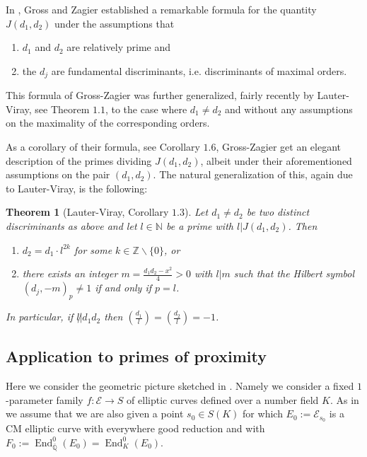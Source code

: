 \documentclass[12pt,twoside,a4paper]{article}
\theoremstyle{plain}%
\newtheorem{theorem}{Theorem}[section] %
\DeclareMathOperator{\End}{End}
\newcommand{\Z}{\mathbb{Z}}
\newcommand{\N}{\mathbb{N}}
\newcommand{\Q}{\mathbb{Q}}
\newcommand{\CE}{\mathcal{E}}
\begin{document}
In \cite{grosszagier}, Gross and Zagier established a remarkable formula for the quantity $J(d_1,d_2)$ under the assumptions that \begin{enumerate}
	\item $d_1$ and $d_2$ are relatively prime and
	\item the $d_j$ are fundamental discriminants, i.e. discriminants of maximal orders.
\end{enumerate}   This formula of Gross-Zagier was further generalized, fairly recently by Lauter-Viray, see \cite{lauterviray} Theorem $1.1$, to the case where $d_1\neq d_2$ and without any assumptions on the maximality of the corresponding orders. 

As a corollary of their formula, see \cite{grosszagier} Corollary $1.6$, Gross-Zagier get an elegant description of the primes dividing $J(d_1,d_2)$, albeit under their aforementioned assumptions on the pair $(d_1,d_2)$. The natural generalization of this, again due to Lauter-Viray, is the following:
\begin{theorem}[Lauter-Viray, \cite{lauterviray} Corollary $1.3$]\label{lauterviraytheorem}
	Let $d_1\neq d_2$ be two distinct discriminants as above and let $l\in \N$ be a prime with $l|J(d_1,d_2)$. Then\begin{enumerate}
		\item $d_2=d_1\cdot l^{2k}$ for some $k\in \Z\backslash \{0\}$, or
		\item there exists an integer $m=\frac{d_1d_2-x^2}{4}>0$ with $l|m$ such that the Hilbert symbol $(d_j,-m)_p\neq 1$ if and only if $p=l$.
	\end{enumerate}
	
	In particular, if $l\not| d_1d_2$ then $\left( \frac{d_1}{l}\right)=\left( \frac{d_2}{l}\right)=-1$.
\end{theorem}

\subsection{Application to primes of proximity}\label{section:applicationsofgrosszagier}

Here we consider the geometric picture sketched in . Namely we consider a fixed $1$-parameter family $f:\CE\rightarrow S$ of elliptic curves defined over a number field $K$. As in  we assume that we are also given a point $s_0\in S(K)$ for which $E_{0}:=\CE_{s_0}$ is a CM elliptic curve with everywhere good reduction and with $F_0:=\End^{0}_{\bar{\Q}}(E_0)=\End^{0}_K(E_0)$. 
\end{document}
